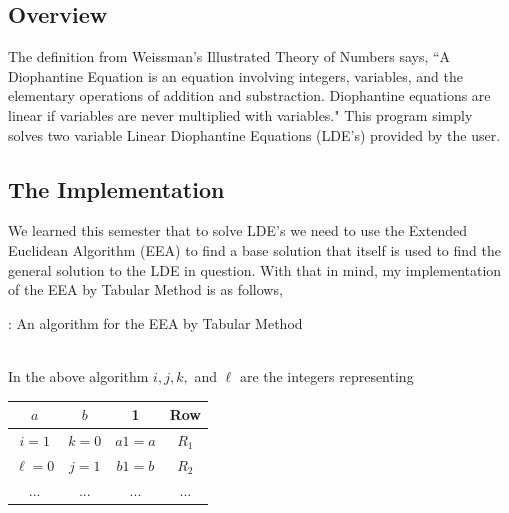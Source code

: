 \documentclass{article}
\begin{document}
\subsection{Overview}
The definition from Weissman's Illustrated Theory of Numbers says, ``A Diophantine Equation is an equation
involving integers, variables, and the elementary operations of addition and substraction. Diophantine equations
are linear if variables are never multiplied with variables." This program simply solves two variable Linear
Diophantine Equations (LDE's) provided by the user.
\subsection{The Implementation}
We learned this semester that to solve LDE's we need to use the Extended Euclidean Algorithm (EEA) to find a base
solution that itself is used to find the general solution to the LDE in question. With that in mind,
my implementation of the EEA by Tabular Method is as follows,
\renewcommand{\algorithmicrequire}{\textbf{Input:}}
\begin{algorithm}
\caption{: An algorithm for the EEA by Tabular Method}
\begin{algorithmic}[1]
 
	 
	 
	 
		 
		\EndIf
		 
	\EndWhile
	 
\end{algorithmic}
\end{algorithm} \\
\newpage
\noindent In the above algorithm $i,j,k,$ and $\ell$ are the integers representing
\begin{table}[h]
\begin{center}
\begin{tabular}{c|c|c|c}
\textbf{$a$} & \textbf{$b$} & 1 & Row\\
\hline
$i = 1$ & $k = 0$ & $a1 = a$ & $R_1$\\
$\ell = 0$ & $j = 1$ & $b1 = b$ & $R_2$\\
... & ... & ... & ... \\
\end{tabular}
\end{center}
\end{table}
\end{document}
